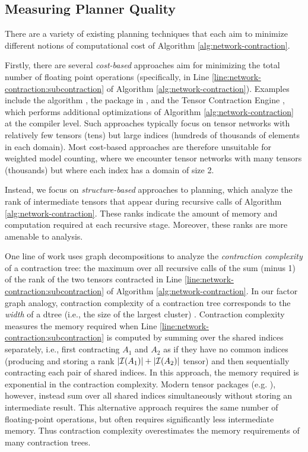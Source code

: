 \subsection{Measuring Planner Quality}
\label{sec:tensors:planning:quality}
There are a variety of existing planning techniques that each aim to minimize different notions of computational cost of Algorithm \ref{alg:network-contraction}.

Firstly, there are several \emph{cost-based} approaches aim for minimizing the total number of floating point operations (specifically, in Line \ref{line:network-contraction:subcontraction} of Algorithm \ref{alg:network-contraction}).
Examples include the  algorithm \cite{PHV14}, the  package in  \cite{numpy}, and the Tensor Contraction Engine \cite{Hirata03}, which performs additional optimizations of Algorithm \ref{alg:network-contraction} at the compiler level.
Such approaches typically focus on tensor networks with relatively few tensors (tens) but large indices (hundreds of thousands of elements in each domain).
Most cost-based approaches are therefore unsuitable for weighted model counting, where we encounter tensor networks with many tensors (thousands) but where each index has a domain of size 2.

Instead, we focus on \emph{structure-based} approaches to planning, which analyze the rank of intermediate tensors that appear during recursive calls of Algorithm \ref{alg:network-contraction}. 
These ranks indicate the amount of memory and computation required at each recursive stage. Moreover, these ranks are more amenable to analysis.

One line of work \cite{MS08,DFGHSW18} uses graph decompositions to analyze the \emph{contraction complexity} of a contraction tree: the maximum over all recursive calls of the sum (minus 1) of the rank of the two tensors contracted in Line \ref{line:network-contraction:subcontraction} of Algorithm \ref{alg:network-contraction}. In our factor graph analogy, contraction complexity of a contraction tree corresponds to the \emph{width} of a dtree (i.e., the size of the largest cluster) \cite{darwiche01b}.
Contraction complexity measures the memory required when Line \ref{line:network-contraction:subcontraction} is computed by summing over the shared indices separately, i.e., first contracting $A_1$ and $A_2$ as if they have no common indices (producing and storing a rank $|\mathcal{I}(A_1)|+|\mathcal{I}(A_2)|$ tensor) and then sequentially contracting each pair of shared indices. In this approach, the memory required is exponential in the contraction complexity. Modern tensor packages (e.g. ), however, instead sum over all shared indices simultaneously without storing an intermediate result. This alternative approach requires the same number of floating-point operations, but often requires significantly less intermediate memory. Thus contraction complexity overestimates the memory requirements of many contraction trees. 

